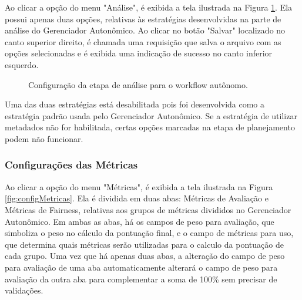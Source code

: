 \documentclass[portugues]{ic-tese}
\begin{document}
Ao clicar a opção do menu "Análise", é exibida a tela ilustrada na Figura \ref{fig:configAnalise}. Ela possui apenas duas opções, relativas às estratégias desenvolvidas na parte de análise do Gerenciador Autonômico. Ao clicar no botão "Salvar" localizado no canto superior direito, é chamada uma requisição que salva o arquivo com as opções selecionadas e é exibida uma indicação de sucesso no canto inferior esquerdo.

\begin{figure}[H]
    \centering
    \caption{Configuração da etapa de análise para o workflow autônomo.}
    \label{fig:configAnalise}
\end{figure}

Uma das duas estratégias está desabilitada pois foi desenvolvida como a estratégia padrão usada pelo Gerenciador Autonômico. Se a estratégia de utilizar metadados não for habilitada, certas opções marcadas na etapa de planejamento podem não funcionar.

\subsubsection{Configurações das Métricas}

Ao clicar a opção do menu "Métricas", é exibida a tela ilustrada na Figura \ref{fig:configMetricas}. Ela é dividida em duas abas: Métricas de Avaliação e Métricas de Fairness, relativas aos grupos de métricas divididos no Gerenciador Autonômico. Em ambas as abas, há os campos de peso para avaliação, que simboliza o peso no cálculo da pontuação final, e o campo de métricas para uso, que determina quais métricas serão utilizadas para o calculo da pontuação de cada grupo. Uma vez que há apenas duas abas, a alteração do campo de peso para avaliação de uma aba automaticamente alterará o campo de peso para avaliação da outra aba para complementar a soma de 100\% sem precisar de validações.
\end{document}
